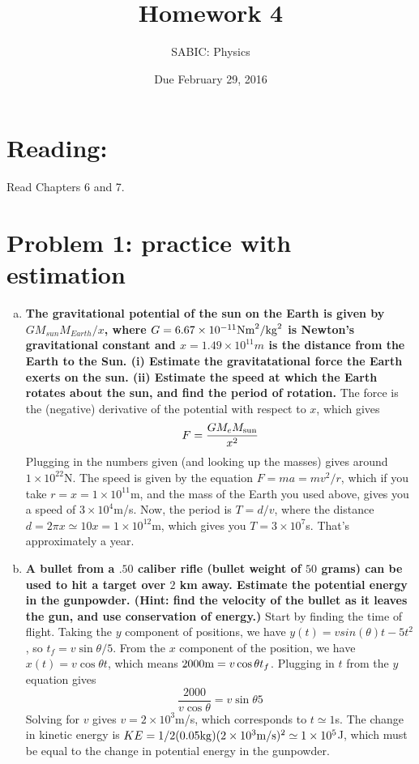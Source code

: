 \documentclass[10pt,letter]{article}
\begin{document}


\title{Homework 4}

\author{SABIC: Physics}

\date{Due February 29, 2016}
 
\maketitle 

\section*{Reading:}
Read Chapters 6 and 7.
\section*{Problem 1: practice with estimation}
\begin{enumerate}[(a)]
\item {\bf The gravitational potential of the sun on the Earth is given by $GM_{sun}M_{Earth}/x$, where $G =6.67 \times 10^{-11} {\rm N m}^2/{\rm kg}^2$ is Newton's gravitational constant and $x = 1.49 \times 10^11 m$ is the distance from the Earth to the Sun. (i) Estimate the gravitatational force the Earth exerts on the sun. (ii) Estimate the speed at which the Earth rotates about the sun, and find the period of rotation.}
The force is the (negative) derivative of the potential with respect to $x$, which gives 
\begin{equation*}
F = \frac{G M_e M_{\rm sun}}{x^2}
\end{equation*}
Plugging in the numbers given (and looking up the masses) gives around $1 \times 10^{22}$N. The speed is given by the equation $F = ma = mv^2/r$, which if you take $r = x = 1\times 10^{11}$m, and the mass of the Earth you used above, gives you a speed of $3 \times 10^4$m/s. Now, the period is $T = d/v$, where the distance $d = 2\pi x \simeq 10x = 1\times 10^{12}$m, which gives you $T = 3 \times 10^7$s. That's approximately a year.
\item {\bf A bullet from a $.50$ caliber rifle (bullet weight of $50$ grams) can be used to hit a target over $2$ km away. Estimate the potential energy in the gunpowder. (Hint: find the velocity of the bullet as it leaves the gun, and use conservation of energy.)}
Start by finding the time of flight. Taking the $y$ component of positions, we have $y(t) = vsin(\theta) t - 5t^2 $, so $t_{f} = v \sin \theta / 5$. From the $x$ component of the position, we have $x(t) = v \cos \theta t $, which means $2000 {\rm m} = v \cos \theta t_f$. Plugging in $t$ from the $y$ equation gives 
\begin{equation*}
\frac{2000}{v\cos\theta} = {v \sin \theta}{5} 
\end{equation*}
Solving for $v$ gives $v = 2 \times 10^3$m/s, which corresponds to $t \simeq 1$s. The change in kinetic energy is $KE = 1/2 (0.05 {\rm kg}) (2 \times 10^3 {\rm m/s})^2  \simeq 1 \times 10^5$J, which must be equal to the change in potential energy in the gunpowder.
\end{enumerate}
\end{document}
